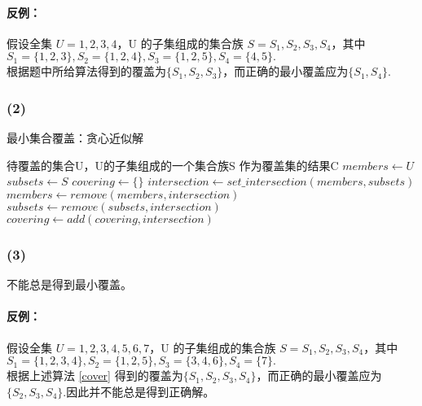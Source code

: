 \documentclass[11pt]{ctexart}
\begin{document}
	\paragraph{反例：}假设全集 $U={1,2,3,4}$，U 的子集组成的集合族	$S={S_{1},S_{2},S_{3},S_{4}}$，其中$S_{1}=\{1,2,3\},S_{2}=\{1,2,4\},S_{3}=\{1,2,5\},S_{4}=\{4,5\}.$\\
	根据题中所给算法得到的覆盖为$\{S_{1},S_{2},S_{3}\}$，而正确的最小覆盖应为$\{S_{1},S_{4}\}.$
	\subsubsection*{(2)}	
	\begin{algorithm}
		\caption{最小集合覆盖：贪心近似解}
		\label{cover}
		\begin{algorithmic}[1]
			\Require 待覆盖的集合U，U的子集组成的一个集合族S
			\Ensure 作为覆盖集的结果C
			\State $members \gets U$
			\State $subsets \gets S$
			\State $covering \gets \{\}$
			\State $intersection \gets set\_intersection(members,subsets)$\footnotemark
			\State $members \gets remove(members,intersection)$
			\State $subsets \gets  remove(subsets,intersection)$\footnotemark
			\State $covering \gets add(covering,intersection)$\footnotemark
			\EndWhile
			\State {}\footnotemark
			\EndIf
			\State {}
			\EndFunction
		\end{algorithmic}
	\end{algorithm}
	
	\subsubsection*{(3)}
	不能总是得到最小覆盖。
	\paragraph{反例：}假设全集 $U={1,2,3,4,5,6,7}$，U 的子集组成的集合族	$S={S_{1},S_{2},S_{3},S_{4}}$，其中$S_{1}=\{1,2,3,4\},S_{2}=\{1,2,5\},S_{3}=\{3,4,6\},S_{4}=\{7\}.$\\
	根据上述算法 \ref{cover} 得到的覆盖为$\{S_{1},S_{2},S_{3},S_{4}\}$，而正确的最小覆盖应为$\{S_{2},S_{3},S_{4}\}.$因此并不能总是得到正确解。
\end{document}
